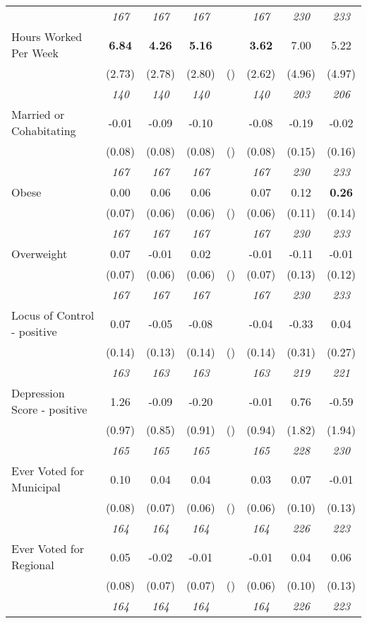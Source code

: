 \begin{tabular}{l c c c c c c c}
& \textit{ 167 } & \textit{ 167 } & \textit{ 167 } & & \textit{ 167 } & \textit{ 230 } & \textit{ 233 } \\
Hours Worked Per Week & \textbf{ 6.84 } & \textbf{ 4.26 } & \textbf{ 5.16 } & & \textbf{3.62} & 7.00 & 5.22 \\
& (2.73) & (2.78) & (2.80) & () & (2.62) & (4.96) & (4.97) \\
& \textit{ 140 } & \textit{ 140 } & \textit{ 140 } & & \textit{ 140 } & \textit{ 203 } & \textit{ 206 } \\
Married or Cohabitating & -0.01 & -0.09 & -0.10 & & -0.08 & -0.19 & -0.02 \\
& (0.08) & (0.08) & (0.08) & () & (0.08) & (0.15) & (0.16) \\
& \textit{ 167 } & \textit{ 167 } & \textit{ 167 } & & \textit{ 167 } & \textit{ 230 } & \textit{ 233 } \\
Obese & 0.00 & 0.06 & 0.06 & & 0.07 & 0.12 & \textbf{ 0.26 } \\
& (0.07) & (0.06) & (0.06) & () & (0.06) & (0.11) & (0.14) \\
& \textit{ 167 } & \textit{ 167 } & \textit{ 167 } & & \textit{ 167 } & \textit{ 230 } & \textit{ 233 } \\
Overweight & 0.07 & -0.01 & 0.02 & & -0.01 & -0.11 & -0.01 \\
& (0.07) & (0.06) & (0.06) & () & (0.07) & (0.13) & (0.12) \\
& \textit{ 167 } & \textit{ 167 } & \textit{ 167 } & & \textit{ 167 } & \textit{ 230 } & \textit{ 233 } \\
Locus of Control - positive & 0.07 & -0.05 & -0.08 & & -0.04 & -0.33 & 0.04 \\
& (0.14) & (0.13) & (0.14) & () & (0.14) & (0.31) & (0.27) \\
& \textit{ 163 } & \textit{ 163 } & \textit{ 163 } & & \textit{ 163 } & \textit{ 219 } & \textit{ 221 } \\
Depression Score - positive & 1.26 & -0.09 & -0.20 & & -0.01 & 0.76 & -0.59 \\
& (0.97) & (0.85) & (0.91) & () & (0.94) & (1.82) & (1.94) \\
& \textit{ 165 } & \textit{ 165 } & \textit{ 165 } & & \textit{ 165 } & \textit{ 228 } & \textit{ 230 } \\
Ever Voted for Municipal & 0.10 & 0.04 & 0.04 & & 0.03 & 0.07 & -0.01 \\
& (0.08) & (0.07) & (0.06) & () & (0.06) & (0.10) & (0.13) \\
& \textit{ 164 } & \textit{ 164 } & \textit{ 164 } & & \textit{ 164 } & \textit{ 226 } & \textit{ 223 } \\
Ever Voted for Regional & 0.05 & -0.02 & -0.01 & & -0.01 & 0.04 & 0.06 \\
& (0.08) & (0.07) & (0.07) & () & (0.06) & (0.10) & (0.13) \\
& \textit{ 164 } & \textit{ 164 } & \textit{ 164 } & & \textit{ 164 } & \textit{ 226 } & \textit{ 223 } \\
\bottomrule
\end{tabular}
